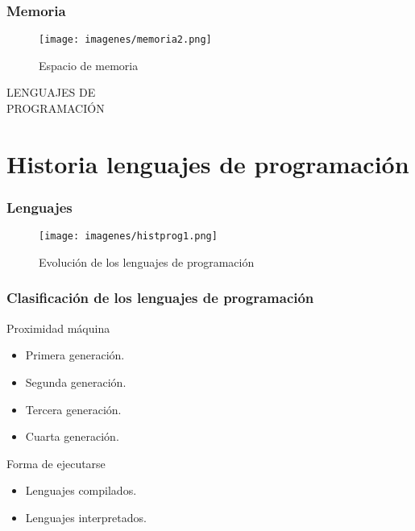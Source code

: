 \documentclass{beamer}
\begin{document}
\begin{frame}
\frametitle{Memoria} 
\begin{figure}
\texttt{[image: imagenes/memoria2.png]} 
\caption{Espacio de memoria}
\end{figure} 
\end{frame}

\begin{frame}
\begin{center}
\begin{Huge}
LENGUAJES DE \\\vspace{0.7cm} PROGRAMACIÓN
\end{Huge}
\end{center}
\end{frame} 

\section{Historia lenguajes de programación} 

\begin{frame}
\frametitle{Lenguajes} 
\begin{figure}
\texttt{[image: imagenes/histprog1.png]} 
\caption{Evolución de los lenguajes de programación}
\end{figure} 
\end{frame}

\begin{frame}
\frametitle{Clasificación de los lenguajes de programación}
\begin{block}{Proximidad máquina}
\begin{itemize}
\item Primera generación.
\item Segunda generación.
\item Tercera generación.
\item Cuarta generación.
\end{itemize}
\end{block}
\pause
\begin{block}{Forma de ejecutarse}
\begin{itemize}
\item Lenguajes compilados.
\item Lenguajes interpretados.
\end{itemize}
\end{block}
\end{frame}
\end{document}

